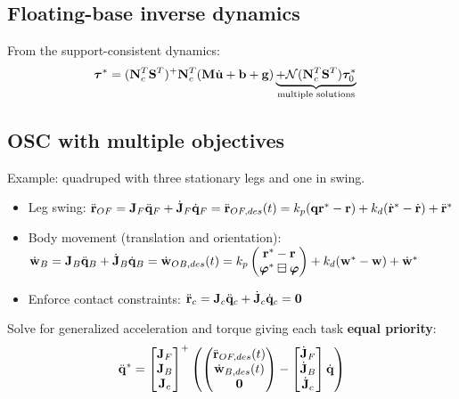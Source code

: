 \documentclass[a4paper, 8pt]{extarticle}
\begin{document}
\begin{multicols*}{3}
\subsection*{Floating-base inverse dynamics}
From the support-consistent dynamics:
\begin{align*}
{\bm \tau}^* &= ({\bf N}^T_c {\bf S}^T )^+{\bf N}_c^T({\bf M}\dot{\bf u} + {\bf b + g}) \underbrace{+  \mathcal{N}({\bf N}^T_c {\bf S}^T)\bm\tau^*_0}_\text{multiple solutions}
\end{align*}



\subsection*{OSC with multiple objectives}
Example: quadruped with three stationary legs and one in swing.
\begin{itemize}
\item Leg swing: $\ddot{\bf r}_{OF} = {\bf J}_F\ddot{\bf q}_F + \dot{\bf J}_F\dot{\bf q}_F = \ddot{\bf r}_{OF,des}(t) = k_p({\bf q
r}^* - {\bf r}) + k_d(\dot{\bf r}^* - \dot{\bf r}) + \ddot{\bf r}^*$
\item Body movement (translation and orientation): $\dot{\bf w}_B = {\bf J}_B\ddot{\bf q}_B + \dot{\bf J}_B\dot{\bf q}_B = \dot{\bf w}_{OB,des}(t) = k_p\begin{pmatrix}{\bf r}^* - {\bf r}\\ 
\bm \varphi^* \boxminus \bm \varphi
\end{pmatrix} + k_d({\bf w}^* - {\bf w}) + \dot{\bf w}^*$
\item Enforce contact constraints: $\ddot{\bf r}_c = {\bf J}_c\ddot{\bf q}_c + \dot{\bf J}_c\dot{\bf q}_c = {\bf 0}$
\end{itemize}
Solve for generalized acceleration and torque giving each task \textbf{equal priority}:
\begin{align*}
\ddot{\bf q}^* = \begin{bmatrix}
{\bf J}_F \\
{\bf J}_B \\
{\bf J}_c
\end{bmatrix}^+\left(
\begin{pmatrix}
\ddot{\bf r}_{OF,des}(t) \\
\dot{\bf w}_{B,des}(t)   \\
{\bf 0}
\end{pmatrix} - \begin{bmatrix}
\dot{\bf J}_F \\
\dot{\bf J}_B \\
\dot{\bf J}_c
\end{bmatrix} \dot{\bf q}
\right)
\end{align*}


\end{multicols*}
\end{document}
